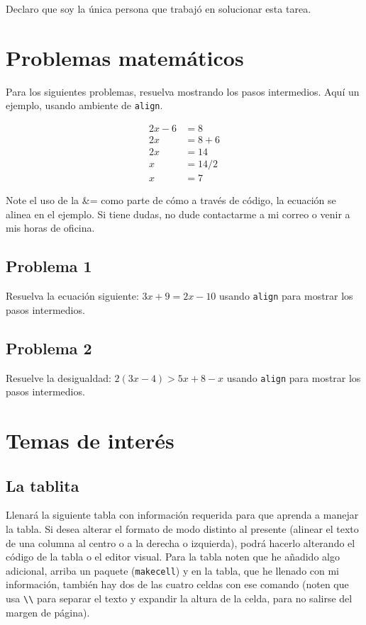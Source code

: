\documentclass[11pt]{article} %
\begin{document}
Declaro que soy la única persona que trabajó en solucionar esta tarea.

\section{Problemas matemáticos}

Para los siguientes problemas, resuelva mostrando los pasos intermedios. Aquí un ejemplo, usando ambiente de \texttt{align}.

\begin{align*}
    2x - 6 &=  8 \\
    2x &= 8+6 \\
    2x &= 14 \\
    x &= 14/2 \\
    x &= 7
\end{align*}

Note el uso de la \&= como parte de cómo a través de código, la ecuación se alinea en el ejemplo. Si tiene dudas, no dude contactarme a mi correo o venir a mis horas de oficina.

\subsection{Problema 1} 

Resuelva la ecuación siguiente: $3x + 9 = 2x - 10$ usando \texttt{align} para mostrar los pasos intermedios.
\subsection{Problema 2} 

Resuelve la desigualdad: $2(3x - 4) > 5x + 8 - x$ usando \texttt{align} para mostrar los pasos intermedios.

\section{Temas de interés}

\subsection{La tablita}
Llenará la siguiente tabla con información requerida para que aprenda a manejar la tabla. Si desea alterar el formato de modo distinto al presente (alinear el texto de una columna al centro o a la derecha o izquierda), podrá hacerlo alterando el código de la tabla o el editor visual. Para la tabla noten que he añadido algo adicional, arriba un paquete (\texttt{makecell}) y en la tabla, que he llenado con mi información, también hay dos de las cuatro celdas con ese comando (noten que usa \texttt{\textbackslash \textbackslash} para separar el texto y expandir la altura de la celda, para no salirse del margen de página).
\end{document}
